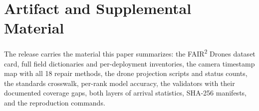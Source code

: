 \documentclass[sigconf]{acmart}
\begin{document}
\section*{Artifact and Supplemental Material}

The release carries the material this paper summarizes: the
FAIR\textsuperscript{2} Drones dataset card, full field dictionaries and
per-deployment inventories, the camera timestamp map with all 18 repair
methods, the drone projection scripts and status counts, the standards
crosswalk, per-rank model accuracy, the validators with their documented
coverage gaps, both layers of arrival statistics, SHA-256 manifests, and
the reproduction commands.



\end{document}

